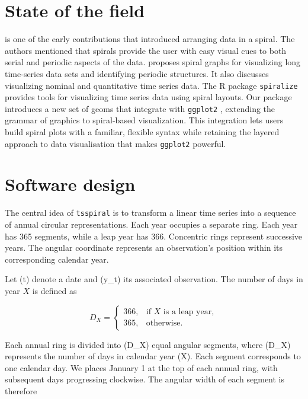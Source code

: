 \documentclass[
  12pt,
  a4paper,
]{article}
\begin{document}
\section{State of the field}\label{state-of-the-field}

\textcite{carlis1998interactive} is one of the early contributions that
introduced arranging data in a spiral. The authors mentioned that
spirals provide the user with easy visual cues to both serial and
periodic aspects of the data. \textcite{weber2001visualizing} proposes
spiral graphs for visualizing long time-series data sets and identifying
periodic structures. It also discusses visualizing nominal and
quantitative time series data. The R package
\texttt{spiralize}\autocite{spiralize} provides tools for visualizing
time series data using spiral layouts. Our package introduces a new set
of geoms that integrate with \texttt{ggplot2} \autocite{ggplot2},
extending the grammar of graphics to spiral-based visualization. This
integration lets users build spiral plots with a familiar, flexible
syntax while retaining the layered approach to data visualisation that
makes \texttt{ggplot2} powerful.

\section{Software design}\label{software-design}

The central idea of \texttt{tsspiral} is to transform a linear time
series into a sequence of annual circular representations. Each year
occupies a separate ring. Each year has 365 segments, while a leap year
has 366. Concentric rings represent successive years. The angular
coordinate represents an observation's position within its corresponding
calendar year.

Let (t) denote a date and (y\_t) its associated observation. The number
of days in year \(X\) is defined as

\[
D_X =
\begin{cases}
366, & \text{if }X\text{ is a leap year},\\
365, & \text{otherwise}.
\end{cases}
\]

Each annual ring is divided into (D\_X) equal angular segments, where
(D\_X) represents the number of days in calendar year (X). Each segment
corresponds to one calendar day. We places January 1 at the top of each
annual ring, with subsequent days progressing clockwise. The angular
width of each segment is therefore
\end{document}
